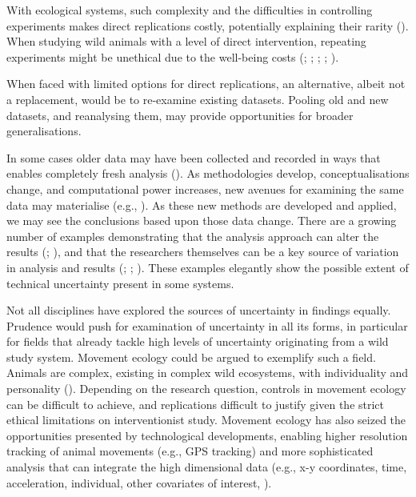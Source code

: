 \documentclass[10pt,a4paper]{article}
\begin{document}
With ecological systems, such complexity and the difficulties in controlling experiments makes direct replications costly, potentially explaining their rarity ().
When studying wild animals with a level of direct intervention, repeating experiments might be unethical due to the well-being costs (; ; ; ; ).

When faced with limited options for direct replications, an alternative, albeit not a replacement, would be to re-examine existing datasets.
Pooling old and new datasets, and reanalysing them, may provide opportunities for broader generalisations.

In some cases older data may have been collected and recorded in ways that enables completely fresh analysis ().
As methodologies develop, conceptualisations change, and computational power increases, new avenues for examining the same data may materialise (e.g., ).
As these new methods are developed and applied, we may see the conclusions based upon those data change.
There are a growing number of examples demonstrating that the analysis approach can alter the results (; ), and that the researchers themselves can be a key source of variation in analysis and results (; ; ).
These examples elegantly show the possible extent of technical uncertainty present in some systems.

Not all disciplines have explored the sources of uncertainty in findings equally.
Prudence would push for examination of uncertainty in all its forms, in particular for fields that already tackle high levels of uncertainty originating from a wild study system.
Movement ecology could be argued to exemplify such a field.
Animals are complex, existing in complex wild ecosystems, with individuality and personality ().
Depending on the research question, controls in movement ecology can be difficult to achieve, and replications difficult to justify given the strict ethical limitations on interventionist study.
Movement ecology has also seized the opportunities presented by technological developments, enabling higher resolution tracking of animal movements (e.g., GPS tracking) and more sophisticated analysis that can integrate the high dimensional data (e.g., x-y coordinates, time, acceleration, individual, other covariates of interest, ).
\end{document}
